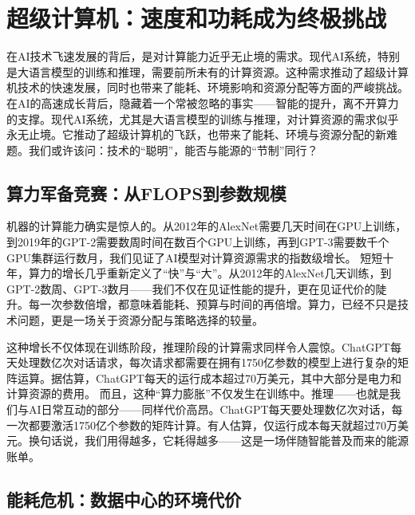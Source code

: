\section{超级计算机：速度和功耗成为终极挑战}

在AI技术飞速发展的背后，是对计算能力近乎无止境的需求。现代AI系统，特别是大语言模型的训练和推理，需要前所未有的计算资源。这种需求推动了超级计算机技术的快速发展，同时也带来了能耗、环境影响和资源分配等方面的严峻挑战。
在AI的高速成长背后，隐藏着一个常被忽略的事实——智能的提升，离不开算力的支撑。现代AI系统，尤其是大语言模型的训练与推理，对计算资源的需求似乎永无止境。它推动了超级计算机的飞跃，也带来了能耗、环境与资源分配的新难题。我们或许该问：技术的“聪明”，能否与能源的“节制”同行？

\subsection{算力军备竞赛：从FLOPS到参数规模}

机器的计算能力确实是惊人的。从2012年的AlexNet需要几天时间在GPU上训练，到2019年的GPT-2需要数周时间在数百个GPU上训练，再到GPT-3需要数千个GPU集群运行数月，我们见证了AI模型对计算资源需求的指数级增长。
短短十年，算力的增长几乎重新定义了“快”与“大”。从2012年的AlexNet几天训练，到GPT-2数周、GPT-3数月——我们不仅在见证性能的提升，更在见证代价的陡升。每一次参数倍增，都意味着能耗、预算与时间的再倍增。算力，已经不只是技术问题，更是一场关于资源分配与策略选择的较量。

这种增长不仅体现在训练阶段，推理阶段的计算需求同样令人震惊。ChatGPT每天处理数亿次对话请求，每次请求都需要在拥有1750亿参数的模型上进行复杂的矩阵运算。据估算，ChatGPT每天的运行成本超过70万美元，其中大部分是电力和计算资源的费用。
而且，这种“算力膨胀”不仅发生在训练中。推理——也就是我们与AI日常互动的部分——同样代价高昂。ChatGPT每天要处理数亿次对话，每一次都要激活1750亿个参数的矩阵计算。有人估算，仅运行成本每天就超过70万美元。换句话说，我们用得越多，它耗得越多——这是一场伴随智能普及而来的能源账单。

\subsection{能耗危机：数据中心的环境代价}

